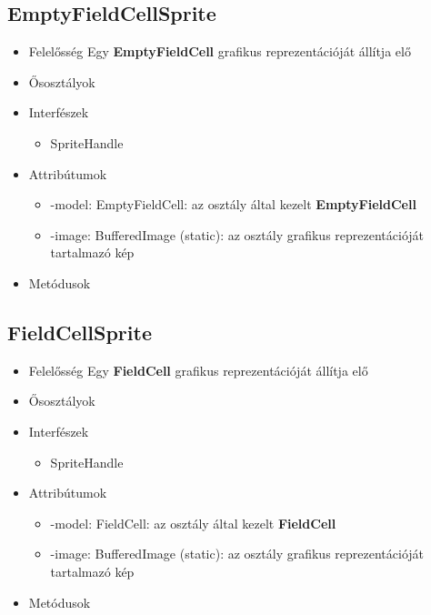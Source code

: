 \subsection{EmptyFieldCellSprite}
\begin{itemize}
\item Felelősség \newline
    Egy \textbf{EmptyFieldCell} grafikus reprezentációját állítja elő
\item Ősosztályok
\item Interfészek
    \begin{itemize}
        \item SpriteHandle
    \end{itemize}
\item Attribútumok
    \begin{itemize}
        \item -model: EmptyFieldCell: az osztály által kezelt \textbf{EmptyFieldCell}
        \item -image: BufferedImage (static): az osztály grafikus reprezentációját tartalmazó kép
    \end{itemize}
\item Metódusok
\end{itemize}

\subsection{FieldCellSprite}
\begin{itemize}
\item Felelősség \newline
    Egy \textbf{FieldCell} grafikus reprezentációját állítja elő
\item Ősosztályok
\item Interfészek
    \begin{itemize}
        \item SpriteHandle
    \end{itemize}
\item Attribútumok
    \begin{itemize}
        \item -model: FieldCell: az osztály által kezelt \textbf{FieldCell}
        \item -image: BufferedImage (static): az osztály grafikus reprezentációját tartalmazó kép
    \end{itemize}
\item Metódusok
\end{itemize}

